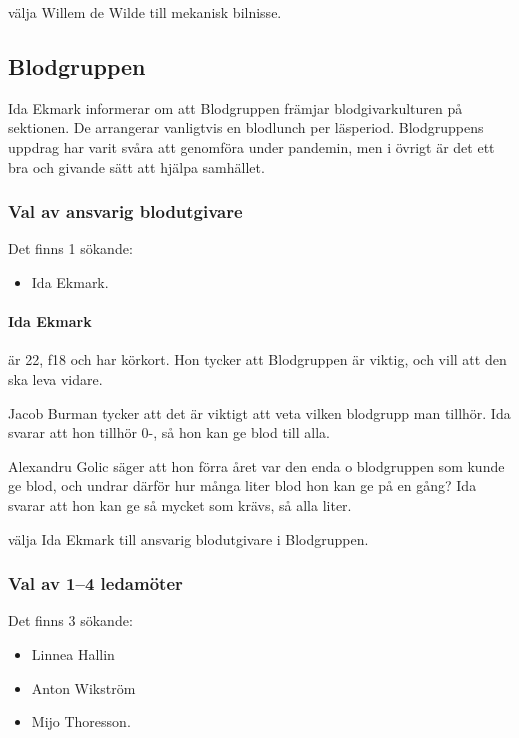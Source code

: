 \documentclass[hidelinks]{sektionsmote}
\begin{document}
\begin{beslut}
  \item välja Willem de Wilde till mekanisk bilnisse.
\end{beslut}


\subsection{Blodgruppen}
Ida Ekmark informerar om att Blodgruppen främjar blodgivarkulturen på sektionen.
De arrangerar vanligtvis en blodlunch per läsperiod.
Blodgruppens uppdrag har varit svåra att genomföra under pandemin, men i övrigt är det ett bra och givande sätt att hjälpa samhället.


\subsubsection{Val av ansvarig blodutgivare}
Det finns 1 sökande:
\begin{itemize}
    \item Ida Ekmark.
\end{itemize}

\paragraph{Ida Ekmark} är 22, f18 och har körkort.
Hon tycker att Blodgruppen är viktig, och vill att den ska leva vidare.

Jacob Burman tycker att det är viktigt att veta vilken blodgrupp man tillhör.
Ida svarar att hon tillhör 0-, så hon kan ge blod till alla.

Alexandru Golic säger att hon förra året var den enda o blodgruppen som kunde ge blod, och undrar därför hur många liter blod hon kan ge på en gång?
Ida svarar att hon kan ge så mycket som krävs, så alla liter.

\begin{beslut}
  \item välja Ida Ekmark till ansvarig blodutgivare i Blodgruppen.
\end{beslut}


\subsubsection{Val av 1--4 ledamöter}
Det finns 3 sökande:
\begin{itemize}
    \item Linnea Hallin
    \item Anton Wikström
    \item Mijo Thoresson.
\end{itemize}
\end{document}
